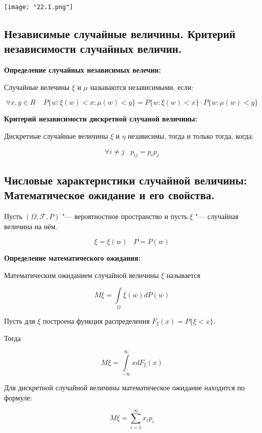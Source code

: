     \begin{center}
        \texttt{[image: "22.1.png"]}
    \end{center}

\subsection{Независимые случайные величины. Критерий независимости случайных величин.}

\textbf{Определение случайных независимых
велечин:}
    \smallskip

    Случайные велечины $\xi$ и $\mu$ называются
    независимыми, если:

    \[ 
        \forall x, y \in R \;\;\;\; P\{w : \xi(w)
        < x; \mu (w) < y\} = P\{w: \xi (w) < x\} \cdot
        P\{w : \mu (w) < y\}
    \]
    \bigskip

\textbf{Критерий независимости дискретной случаной величины:}
    \smallskip

    Дискретные случайные величины $\xi$ и $\eta$ независимы, тогда
    и только тогда, когда:

    \[
        \forall i \neq j \;\;\; p_{ij} = p_i p_j  
    \]
    \bigskip

\subsection{Числовые характеристики случайной величины: Математическое ожидание
и его свойства.}    

Пусть $(\Omega, \mathcal{F}, P)$ "--- вероятностное пространство
и пусть $\xi$ "--- случайная величина на нём.

\[
\xi = \xi(w) \;\;\; P = P(w)
\]
\bigskip

\textbf{Определение математического ожидания:}
    \smallskip

    Математическим ожиданием случайной величины $\xi$ называется

    \[
        M\xi = \int\limits_{\Omega} \xi(w) d P(w)  
    \]

    Пусть для $\xi$ построена функция распределения $F_{\xi}(x) =
    P\{\xi < x\}$.

    Тогда

    \[
        M\xi = \int\limits^{\infty}_{-\infty}  x d F_{\xi} (x)  
    \]

    Для дискретной случайной величины математическое ожидание 
    находится по формуле:

    \[
        M\xi = \sum^{\infty}_{i = 1} x_i p_i  
    \]

